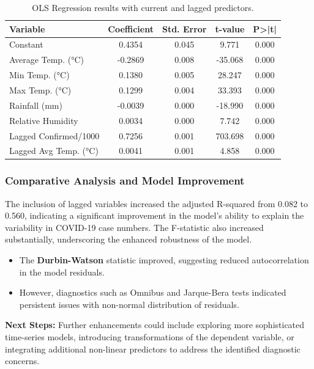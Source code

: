 \documentclass[sigconf,screen,nonacm]{acmart}
\begin{document}
\begin{table}[H]
\centering
\caption{OLS Regression results with current and lagged predictors.}
\label{tab:regression_results_enhanced}
\begin{tabular}{lcccc}
\hline
\textbf{Variable} & \textbf{Coefficient} & \textbf{Std. Error} & \textbf{t-value} & \textbf{P>|t|} \\
\hline
Constant & 0.4354 & 0.045 & 9.771 & 0.000 \\
Average Temp. (°C) & -0.2869 & 0.008 & -35.068 & 0.000 \\
Min Temp. (°C) & 0.1380 & 0.005 & 28.247 & 0.000 \\
Max Temp. (°C) & 0.1299 & 0.004 & 33.393 & 0.000 \\
Rainfall (mm) & -0.0039 & 0.000 & -18.990 & 0.000 \\
Relative Humidity & 0.0034 & 0.000 & 7.742 & 0.000 \\
Lagged Confirmed/1000 & 0.7256 & 0.001 & 703.698 & 0.000 \\
Lagged Avg Temp. (°C) & 0.0041 & 0.001 & 4.858 & 0.000 \\
\hline
\end{tabular}
\end{table}

\subsubsection{Comparative Analysis and Model Improvement}
The inclusion of lagged variables increased the adjusted R-squared from 0.082 to 0.560, indicating a significant improvement in the model's ability to explain the variability in COVID-19 case numbers. The F-statistic also increased substantially, underscoring the enhanced robustness of the model.

\begin{itemize}
    \item The \textbf{Durbin-Watson} statistic improved, suggesting reduced autocorrelation in the model residuals.
    \item However, diagnostics such as Omnibus and Jarque-Bera tests indicated persistent issues with non-normal distribution of residuals.
\end{itemize}

\textbf{Next Steps:} Further enhancements could include exploring more sophisticated time-series models, introducing transformations of the dependent variable, or integrating additional non-linear predictors to address the identified diagnostic concerns.
\end{document}
